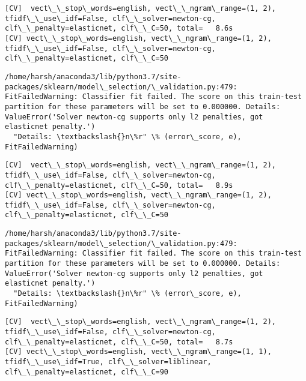 \documentclass[11pt]{article}
\begin{document}
    \begin{Verbatim}[commandchars=\\\{\}]
[CV]  vect\_\_stop\_words=english, vect\_\_ngram\_range=(1, 2), tfidf\_\_use\_idf=False, clf\_\_solver=newton-cg, clf\_\_penalty=elasticnet, clf\_\_C=50, total=   8.6s
[CV] vect\_\_stop\_words=english, vect\_\_ngram\_range=(1, 2), tfidf\_\_use\_idf=False, clf\_\_solver=newton-cg, clf\_\_penalty=elasticnet, clf\_\_C=50 

    \end{Verbatim}

    \begin{Verbatim}[commandchars=\\\{\}]
/home/harsh/anaconda3/lib/python3.7/site-packages/sklearn/model\_selection/\_validation.py:479: FitFailedWarning: Classifier fit failed. The score on this train-test partition for these parameters will be set to 0.000000. Details: 
ValueError('Solver newton-cg supports only l2 penalties, got elasticnet penalty.')
  "Details: \textbackslash{}n\%r" \% (error\_score, e), FitFailedWarning)

    \end{Verbatim}

    \begin{Verbatim}[commandchars=\\\{\}]
[CV]  vect\_\_stop\_words=english, vect\_\_ngram\_range=(1, 2), tfidf\_\_use\_idf=False, clf\_\_solver=newton-cg, clf\_\_penalty=elasticnet, clf\_\_C=50, total=   8.9s
[CV] vect\_\_stop\_words=english, vect\_\_ngram\_range=(1, 2), tfidf\_\_use\_idf=False, clf\_\_solver=newton-cg, clf\_\_penalty=elasticnet, clf\_\_C=50 

    \end{Verbatim}

    \begin{Verbatim}[commandchars=\\\{\}]
/home/harsh/anaconda3/lib/python3.7/site-packages/sklearn/model\_selection/\_validation.py:479: FitFailedWarning: Classifier fit failed. The score on this train-test partition for these parameters will be set to 0.000000. Details: 
ValueError('Solver newton-cg supports only l2 penalties, got elasticnet penalty.')
  "Details: \textbackslash{}n\%r" \% (error\_score, e), FitFailedWarning)

    \end{Verbatim}

    \begin{Verbatim}[commandchars=\\\{\}]
[CV]  vect\_\_stop\_words=english, vect\_\_ngram\_range=(1, 2), tfidf\_\_use\_idf=False, clf\_\_solver=newton-cg, clf\_\_penalty=elasticnet, clf\_\_C=50, total=   8.7s
[CV] vect\_\_stop\_words=english, vect\_\_ngram\_range=(1, 1), tfidf\_\_use\_idf=True, clf\_\_solver=liblinear, clf\_\_penalty=elasticnet, clf\_\_C=90 

    \end{Verbatim}
\end{document}
